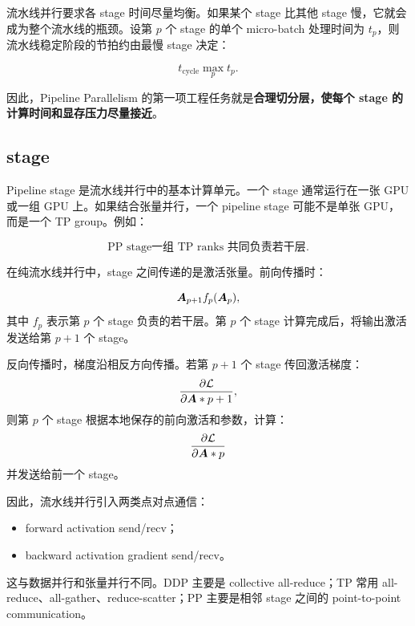 流水线并行要求各 stage 时间尽量均衡。如果某个 stage 比其他 stage 慢，它就会成为整个流水线的瓶颈。设第 $p$ 个 stage 的单个 micro-batch 处理时间为 $t_p$，则流水线稳定阶段的节拍约由最慢 stage 决定：

\[
t_{\mathrm{cycle}}
\max_{p} t_p.
\]

因此，Pipeline Parallelism 的第一项工程任务就是\textbf{合理切分层，使每个 stage 的计算时间和显存压力尽量接近}。

\subsection{stage}
\label{subsec:pipeline-stage}

Pipeline stage 是流水线并行中的基本计算单元。一个 stage 通常运行在一张 GPU 或一组 GPU 上。如果结合张量并行，一个 pipeline stage 可能不是单张 GPU，而是一个 TP group。例如：

\[
\text{PP stage}
\text{一组 TP ranks 共同负责若干层}.
\]

在纯流水线并行中，stage 之间传递的是激活张量。前向传播时：

\[
\bm{A}_{p+1}
f_p(\bm{A}_p),
\]
其中 $f_p$ 表示第 $p$ 个 stage 负责的若干层。第 $p$ 个 stage 计算完成后，将输出激活发送给第 $p+1$ 个 stage。

反向传播时，梯度沿相反方向传播。若第 $p+1$ 个 stage 传回激活梯度：
\[
\frac{\partial \mathcal{L}}{\partial \bm{A}*{p+1}},
\]
则第 $p$ 个 stage 根据本地保存的前向激活和参数，计算：
\[
\frac{\partial \mathcal{L}}{\partial \bm{A}*{p}}
\]
并发送给前一个 stage。

因此，流水线并行引入两类点对点通信：

\begin{itemize}
\item forward activation send/recv；
\item backward activation gradient send/recv。
\end{itemize}

这与数据并行和张量并行不同。DDP 主要是 collective all-reduce；TP 常用 all-reduce、all-gather、reduce-scatter；PP 主要是相邻 stage 之间的 point-to-point communication。

